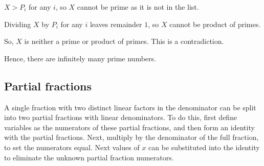 $X>P_i$ for any $i$, so $X$ cannot be prime as it is not in the list.

Dividing $X$ by $P_i$ for any $i$ leaves remainder $1$, so $X$ cannot be product of primes.

So, $X$ is neither a prime or product of primes. This is a contradiction.

Hence, there are infinitely many prime numbers.

\subsection{Partial fractions}
A single fraction with two distinct linear factors in the denominator can be split into two partial fractions with linear denominators. To do this, first define variables as the numerators of these partial fractions, and then form an identity with the partial fractions. Next, multiply by the denominator of the full fraction, to set the numerators equal. Next values of $x$ can be substituted into the identity to eliminate the unknown partial fraction numerators.
